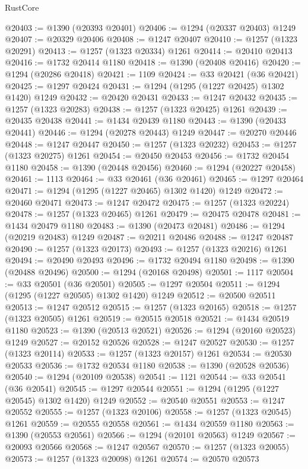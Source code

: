 \begin{lexlean}{RustCore}
\begin{coremodule}
@20403 := @1390 (@20393 @20401)
@20406 := @1294 (@20337 @20403) @1249
@20407 := @20329 @20406
@20408 := @1247 @20407
@20410 := @1257 (@1323 @20291)
@20413 := @1257 (@1323 @20334) @1261
@20414 := @20410 @20413
@20416 := @1732 @20414 @1180
@20418 := @1390 (@20408 @20416)
@20420 := @1294 (@20286 @20418)
@20421 := 1109
@20424 := @33 @20421 (@36 @20421)
@20425 := @1297 @20424
@20431 := @1294 (@1295 (@1227 @20425) @1302 @1420) @1249
@20432 := @20420 @20431
@20433 := @1247 @20432
@20435 := @1257 (@1323 @20283)
@20438 := @1257 (@1323 @20425) @1261
@20439 := @20435 @20438
@20441 := @1434 @20439 @1180
@20443 := @1390 (@20433 @20441)
@20446 := @1294 (@20278 @20443) @1249
@20447 := @20270 @20446
@20448 := @1247 @20447
@20450 := @1257 (@1323 @20232)
@20453 := @1257 (@1323 @20275) @1261
@20454 := @20450 @20453
@20456 := @1732 @20454 @1180
@20458 := @1390 (@20448 @20456)
@20460 := @1294 (@20227 @20458)
@20461 := 1113
@20464 := @33 @20461 (@36 @20461)
@20465 := @1297 @20464
@20471 := @1294 (@1295 (@1227 @20465) @1302 @1420) @1249
@20472 := @20460 @20471
@20473 := @1247 @20472
@20475 := @1257 (@1323 @20224)
@20478 := @1257 (@1323 @20465) @1261
@20479 := @20475 @20478
@20481 := @1434 @20479 @1180
@20483 := @1390 (@20473 @20481)
@20486 := @1294 (@20219 @20483) @1249
@20487 := @20211 @20486
@20488 := @1247 @20487
@20490 := @1257 (@1323 @20173)
@20493 := @1257 (@1323 @20216) @1261
@20494 := @20490 @20493
@20496 := @1732 @20494 @1180
@20498 := @1390 (@20488 @20496)
@20500 := @1294 (@20168 @20498)
@20501 := 1117
@20504 := @33 @20501 (@36 @20501)
@20505 := @1297 @20504
@20511 := @1294 (@1295 (@1227 @20505) @1302 @1420) @1249
@20512 := @20500 @20511
@20513 := @1247 @20512
@20515 := @1257 (@1323 @20165)
@20518 := @1257 (@1323 @20505) @1261
@20519 := @20515 @20518
@20521 := @1434 @20519 @1180
@20523 := @1390 (@20513 @20521)
@20526 := @1294 (@20160 @20523) @1249
@20527 := @20152 @20526
@20528 := @1247 @20527
@20530 := @1257 (@1323 @20114)
@20533 := @1257 (@1323 @20157) @1261
@20534 := @20530 @20533
@20536 := @1732 @20534 @1180
@20538 := @1390 (@20528 @20536)
@20540 := @1294 (@20109 @20538)
@20541 := 1121
@20544 := @33 @20541 (@36 @20541)
@20545 := @1297 @20544
@20551 := @1294 (@1295 (@1227 @20545) @1302 @1420) @1249
@20552 := @20540 @20551
@20553 := @1247 @20552
@20555 := @1257 (@1323 @20106)
@20558 := @1257 (@1323 @20545) @1261
@20559 := @20555 @20558
@20561 := @1434 @20559 @1180
@20563 := @1390 (@20553 @20561)
@20566 := @1294 (@20101 @20563) @1249
@20567 := @20093 @20566
@20568 := @1247 @20567
@20570 := @1257 (@1323 @20055)
@20573 := @1257 (@1323 @20098) @1261
@20574 := @20570 @20573

\end{coremodule}
\end{lexlean}
